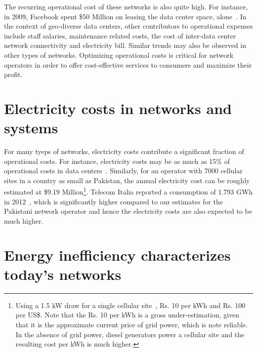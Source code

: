 The recurring operational cost of these networks is also quite high. For instance, in 2009, Facebook spent \$50 Million on leasing the data center space, alone~\cite{FBLease}. In the context of geo-diverse data centers, other contributors to operational expenses include staff salaries, maintenance related costs, the cost of inter-data center network connectivity and electricity bill. Similar trends may also be observed in other types of networks. Optimizing operational costs is critical for network operators in order to offer cost-effective services to consumers and maximize their profit.

\section{Electricity costs in networks and systems} 
For many tyeps of networks, electricity costs contribute a significant fraction of operational costs. For instance, electricity costs may be as much as 15\% of operational costs in data centers~\cite{costCloud}. Similarly, for an operator with 7000 cellular sites in a country as small as Pakistan, the annual electricity cost can be roughly estimated at \$9.19 Million\footnote{Using a 1.5 kW draw for a single cellular site~\cite{mbakwe:btshybribpower:2011:necec}, Rs. 10 per kWh and Rs. 100 per US\$. Note that the Rs. 10 per kWh is a gross under-estimation, given that it is the approximate current price of grid power, which is note reliable. In the absence of grid power, diesel generators power a cellular site and the resulting cost per kWh is much higher.}. Telecom Italia reported a consumption of 1.793 GWh in 2012~\cite{TIAnnualReport}, which is significantly higher compared to our estimates for the Pakistani network operator and hence the electricity costs are also expected to be much higher. 

\section{Energy inefficiency characterizes today's networks} 

